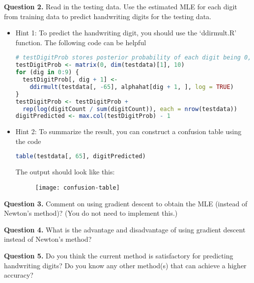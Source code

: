 \documentclass[twoside, letter]{article}
\begin{document}
{\bf Question 2.} Read in the testing data. Use the estimated MLE for each digit from training data to predict handwriting digits for the testing data. 
\begin{itemize}
\item Hint 1: To predict the handwriting digit, you should use the `ddirmult.R' function. 
The following code can be helpful 
\begin{lstlisting}[language=R]
# testDigitProb stores posterior probability of each digit being 0,1,...,9
testDigitProb <- matrix(0, dim(testdata)[1], 10)
for (dig in 0:9) {
  testDigitProb[, dig + 1] <-
    ddirmult(testdata[, -65], alphahat[dig + 1, ], log = TRUE)
}
testDigitProb <- testDigitProb +
  rep(log(digitCount / sum(digitCount)), each = nrow(testdata))
digitPredicted <- max.col(testDigitProb) - 1
\end{lstlisting}

\item Hint 2: To summarize the result, you can construct a confusion table using the code
\begin{lstlisting}[language = R]
table(testdata[, 65], digitPredicted)
\end{lstlisting}
The output should look like this:
\begin{figure}[!h]
\centering
\texttt{[image: confusion-table]}
\end{figure}
\end{itemize}

{\bf Question 3.} Comment on using gradient descent to obtain the MLE (instead of Newton's method)? (You do not need to implement this.) 


{\bf Question 4.} What is the advantage and disadvantage of using gradient descent instead of Newton's method?

{\bf Question 5.} Do you think the current method is satisfactory for predicting handwriting digits? Do you know any other method(s) that can achieve a higher accuracy? 
\end{document}
